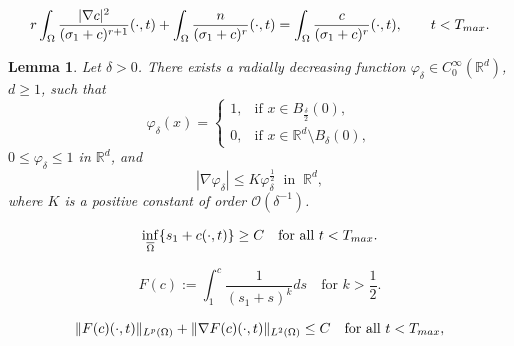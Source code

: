 \documentclass[10pt,a4paper]{amsart}
\newtheorem{lemma}{Lemma}
\begin{document}
\begin{equation}\label{NABLACL2}
r\int_{\Omega}\frac{|\nabla c|^{2}}{(\sigma_{1}+c)^{r+1}}(\cdot,t)+\int_{\Omega}\frac{n}{(\sigma_{1}+c)^{r}}(\cdot,t)=\int_{\Omega}\frac{c}{(\sigma_{1}+c)^{r}}(\cdot,t),\qquad t<T_{\rm max}.
\end{equation}

\begin{lemma}\label{LEMSTEST}
Let $\delta >0$. There exists a radially decreasing function 
$\varphi_{\delta} \in C_{0}^{\infty}(\mathbb{R}^d)$, $d\ge1$,  such that 
	\[
	\varphi_{\delta}(x) = 
	\begin{cases}
		1, & \text{if } x\in B_{\frac{\delta}{2}}(0), \\
		0, & \text{if } x\in \mathbb{R}^d \setminus B_{\delta}(0),
	\end{cases}
	\]
	$0\leq \varphi_{\delta} \leq 1 $    in $\mathbb{R}^d$,
	and 
	\[
 |\nabla \varphi_{\delta}| \leq K \varphi_{\delta}^{\frac{1}{2}} \ \text{ in } \ \mathbb{R}^d,
	\]
	where $K$ is a positive constant of order $\mathcal{O}(\delta^{-1})$.
\end{lemma}

 \begin{equation}\label{CLOWER}
\inf_{\overline{\Omega}}\{s_{1}+c(\cdot,t)\}\ge C\quad\mbox{for all }t<T_{\rm max}.
 \end{equation}

\begin{equation}\label{FunctionF}
 F(c):=  \int_{1}^{c}\frac{1}{(s_{1}+s)^{k}}ds \quad  \mbox{for } k>\frac{1}{2}.
\end{equation}

\begin{equation}\label{FLEM}
 \|F(c)(\cdot,t)\|_{L^{p}(\Omega)}+\|\nabla F(c)(\cdot,t)\|_{L^{2}(\Omega)} \le C\quad\mbox{for all }t<T_{\rm max},
\end{equation}
\end{document}

